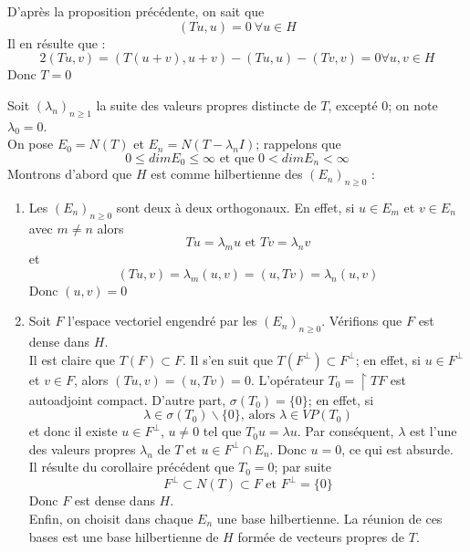 \begin{dem}
	D'après la proposition précédente, on sait que \[(Tu,u)=0\ \forall u\in H\]
Il en résulte que :
	\[2(Tu,v)=(T(u+v),u+v)-(Tu,u)-(Tv,v)=0 \forall u,v\in H\]
Donc $T=0$
\end{dem}


\begin{dem}
Soit $(\lambda_n)_{n\geq 1}$ la suite des valeurs propres distincte de $T$, excepté $0$; on note $\lambda_0=0$.\\
On pose $E_0=N(T)$ et $E_n=N(T-\lambda_n I)$; rappelons que \[0\leq dim E_0\leq \infty \text{ et que } 0<dim E_n<\infty\]
Montrons d'abord que $H$ est comme hilbertienne des $(E_n)_{n\geq 0}$ :
\begin{enumerate}
	\item Les $(E_n)_{n\geq 0}$ sont deux à deux orthogonaux. En effet, si $u\in E_{m}$ et $v\in E_n$ avec $m\neq n$ alors 
	\[Tu=\lambda_mu \text{ et } Tv=\lambda_n v\]
et \[(Tu,v)=\lambda_m(u,v)=(u,Tv)=\lambda_n(u,v)\]
Donc $(u,v)=0$

	\item Soit $F$ l'espace vectoriel engendré par les $(E_n)_{n\geq 0}$. Vérifions que $F$ est dense dans $H$.\\
Il est claire que $T(F)\subset F$. Il s'en suit que $T(F^\perp)\subset F^\perp$; en effet, si $u\in F^\perp$ et $v\in F$, alors $(Tu,v)=(u,Tv)=0$. L'opérateur $T_0=\restriction{T}{F}$ est autoadjoint compact. D'autre part, $\sigma(T_0)=\{0\}$; en effet, si
	\[\lambda\in\sigma(T_0)\backslash\{0\}\text{, alors } \lambda\in VP(T_0)\]
et donc il existe $u\in F^\perp$, $u\neq 0$ tel que $T_0u=\lambda u$. Par conséquent, $\lambda$ est l'une des valeurs propres $\lambda_n$ de $T$ et $u\in F^\perp\cap E_n$. Donc $u=0$, ce qui est absurde.\\
Il résulte du corollaire précédent que $T_0=0$; par suite
	\[F^\perp\subset N(T)\subset F \text{ et } F^\perp=\{0\}\]
Donc $F$ est dense dans $H$.\\
Enfin, on choisit dans chaque $E_n$ une base hilbertienne. La réunion de ces bases est une base hilbertienne de $H$ formée de vecteurs propres de $T$.
\end{enumerate}
\end{dem}

